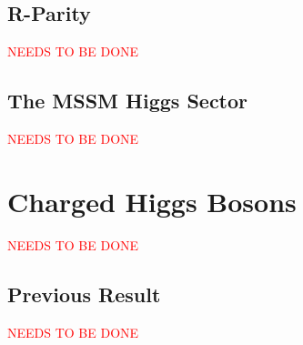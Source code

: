 	\subsection{R-Parity}\label{ssec:R-Parity}
		\textcolor{red}{NEEDS TO BE DONE}

	\subsection{The MSSM Higgs Sector}\label{ssec:MSMM Higgs}
		\textcolor{red}{NEEDS TO BE DONE}

\section{Charged Higgs Bosons}\label{sec:HPlus}
	\textcolor{red}{NEEDS TO BE DONE}

	\subsection{Previous Result}\label{ssec:Prev HPlus}
		\textcolor{red}{NEEDS TO BE DONE}